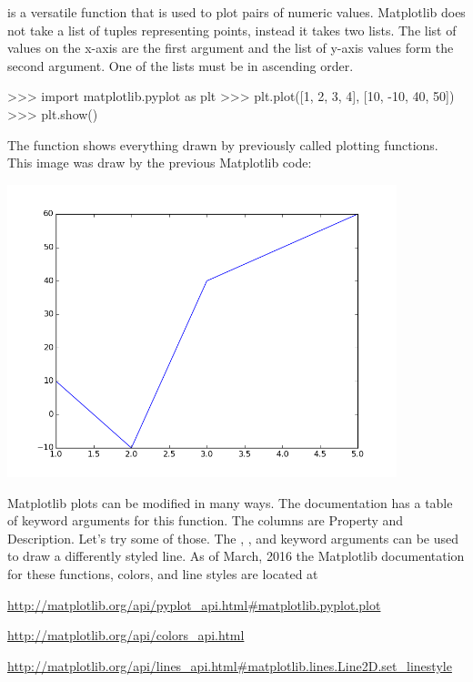 \documentclass[11pt]{cselabheader}
\begin{document}
 is a versatile function that is used to plot
pairs of numeric values. Matplotlib does not take a list of tuples
representing points, instead it takes two lists. The list of values on
the x-axis are the first argument and the list of y-axis values form
the second argument. One of the lists must be in ascending order.

\begin{pyconcode}
>>> import matplotlib.pyplot as plt
>>> plt.plot([1, 2, 3, 4], [10, -10, 40, 50])
>>> plt.show()
\end{pyconcode}

The  function shows everything drawn by
previously called plotting functions. This image was draw by
the previous Matplotlib code:

\begin{center}
\includegraphics[width=0.85\textwidth]{img/matplotlib_plot1.png}
\end{center}

Matplotlib plots can be modified in many ways. The documentation has a
table of keyword arguments for this function. The columns are Property
and Description.  Let's try some of those. The ,
, and  keyword arguments
can be used to draw a differently styled line.  As of March, 2016 the
Matplotlib documentation for these functions, colors, and line styles
are located at

\begin{center}
\url{http://matplotlib.org/api/pyplot_api.html#matplotlib.pyplot.plot}

\url{http://matplotlib.org/api/colors_api.html}

\url{http://matplotlib.org/api/lines_api.html#matplotlib.lines.Line2D.set_linestyle}
\end{center}
\end{document}
